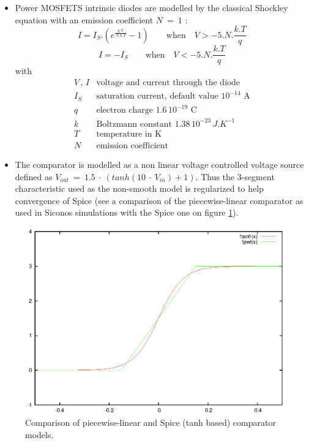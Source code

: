 \begin{itemize}
\item Power MOSFETS intrinsic diodes are modelled by the classical Shockley equation with an emission
coefficient $N~=~1$ :
\[ I = I_S.({e^{\frac{q.V}{N.k.T}} - 1}) \qquad \textrm{when} \quad V > -5.N.\frac{k.T}{q} \]
\[ I = -I_S \qquad  \textrm{when} \quad V < -5.N.\frac{k.T}{q} \]
with
\[
\begin{array}{ll}
V\,,\,I & \textrm{voltage and current through the diode}\\
I_S & \textrm{saturation current, default value $10^{-14}$~A}\\
q & \textrm{electron charge $1.6\,10^{-19}$~C}\\
k & \textrm{Boltzmann constant $1.38\,10^{-23}\,J.K^{-1}$}\\
T & \textrm{temperature in K}\\
N & \textrm{emission coefficient}
\end{array}
\]
\item The comparator is modelled as a non linear voltage controlled voltage source defined as $V_{out}~=~1.5~\cdot~(tanh(10~\cdot~V_{in}) + 1)$. Thus the 3-segment characteristic used as the non-smooth model is regularized to help convergence of {\sc Spice}
(see a comparison of the piecewise-linear comparator as used in {\sc Siconos} simulations with the {\sc Spice} one on figure \ref{fig-comparator-models}).
\end{itemize}

\begin{figure}[hbtp]
\begin{center}
\includegraphics[scale=0.6,angle=0]{./figure/comparators.eps}
\end{center}
\caption{Comparison of piecewise-linear and {\sc Spice} (tanh based) comparator models.}
\label{fig-comparator-models}
\end{figure}



